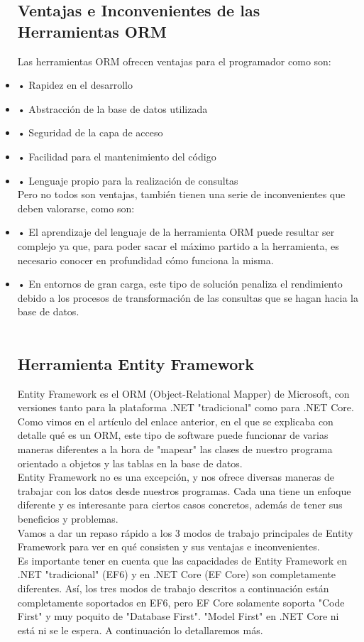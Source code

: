 \documentclass[twoside,twocolumn]{article}
\begin{document}
\begin{flushright}
\begin{itemize}
\subsection{Ventajas e Inconvenientes de las Herramientas ORM}
Las herramientas ORM ofrecen ventajas para el programador como son:
\textbf{}\\
\item • Rapidez en el desarrollo
\item • Abstracción de la base de datos utilizada
\item • Seguridad de la capa de acceso
\item • Facilidad para el mantenimiento del código
\item • Lenguaje propio para la realización de consultas
\textbf{}\\
Pero no todos son ventajas, también tienen una serie de inconvenientes que deben valorarse, como son:
\textbf{}\\
\item • El aprendizaje del lenguaje de la herramienta ORM puede resultar ser complejo ya que, para poder sacar el máximo partido a la herramienta, es necesario conocer en profundidad cómo funciona la misma.
\item • En entornos de gran carga, este tipo de solución penaliza el rendimiento debido a los procesos de transformación de las consultas que se hagan hacia la base de datos.
\textbf{}\\
\textbf{}\\
\subsection{Herramienta Entity Framework}

Entity Framework es el ORM (Object-Relational Mapper) de Microsoft, con versiones tanto para la plataforma .NET "tradicional" como para .NET Core.\textbf{}\\
Como vimos en el artículo del enlace anterior, en el que se explicaba con detalle qué es un ORM, este tipo de software puede funcionar de varias maneras diferentes a la hora de "mapear" las clases de nuestro programa orientado a objetos y las tablas en la base de datos.\textbf{}\\
Entity Framework no es una excepción, y nos ofrece diversas maneras de trabajar con los datos desde nuestros programas. Cada una tiene un enfoque diferente y es interesante para ciertos casos concretos, además de tener sus beneficios y problemas.\textbf{}\\
Vamos a dar un repaso rápido a los 3 modos de trabajo principales de Entity Framework para ver en qué consisten y sus ventajas e inconvenientes.\textbf{}\\
Es importante tener en cuenta que las capacidades de Entity Framework en .NET "tradicional" (EF6) y en .NET Core (EF Core) son completamente diferentes. Así, los tres modos de trabajo descritos a continuación están completamente soportados en EF6, pero EF Core solamente soporta "Code First" y muy poquito de "Database First". "Model First" en .NET Core ni está ni se le espera. A continuación lo detallaremos más.
\textbf{}\\
\textbf{}\\

\end{itemize}
\end{flushright}
\end{document}
